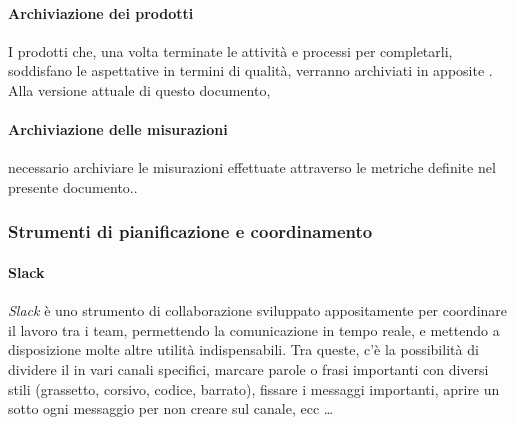     		\paragraph{Archiviazione dei prodotti}
			I prodotti che, una volta terminate le attività e processi per completarli, soddisfano le aspettative in termini di qualità,
			verranno archiviati in apposite . Alla versione attuale di questo documento,
    		
    		\paragraph{Archiviazione delle misurazioni} %
    		necessario archiviare le misurazioni effettuate attraverso le metriche definite nel presente documento..
    		
    	\subsubsection{Strumenti di pianificazione e coordinamento}
    	
    		\paragraph{Slack} %
			\emph{Slack} è uno strumento di collaborazione sviluppato appositamente per coordinare il lavoro tra i team, permettendo la comunicazione in tempo
			reale, e mettendo a disposizione molte altre utilità indispensabili. Tra queste, c'è la possibilità di dividere il  in vari canali
			specifici, marcare parole o frasi importanti con diversi stili (grassetto, corsivo, codice, barrato), fissare i messaggi importanti, aprire un 
			sotto ogni messaggio per non creare  sul canale, ecc \dots

